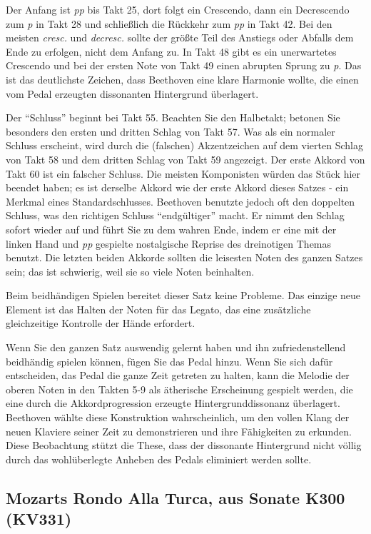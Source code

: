 Der Anfang ist \textit{pp} bis Takt 25, dort folgt ein Crescendo, dann ein Decrescendo zum \textit{p} in Takt 28 und schließlich die Rückkehr zum \textit{pp} in Takt 42.
Bei den meisten \textit{cresc.} und \textit{decresc.} sollte der größte Teil des Anstiegs oder Abfalls dem Ende zu erfolgen, nicht dem Anfang zu.
In Takt 48 gibt es ein unerwartetes Crescendo und bei der ersten Note von Takt 49 einen abrupten Sprung zu \textit{p}.
Das ist das deutlichste Zeichen, dass Beethoven eine klare Harmonie wollte, die einen vom Pedal erzeugten dissonanten Hintergrund überlagert.

Der \enquote{Schluss} beginnt bei Takt 55.
Beachten Sie den Halbetakt; betonen Sie besonders den ersten und dritten Schlag von Takt 57.
Was als ein normaler Schluss erscheint, wird durch die (falschen) Akzentzeichen auf dem vierten Schlag von Takt 58 und dem dritten Schlag von Takt 59 angezeigt.
Der erste Akkord von Takt 60 ist ein falscher Schluss.
Die meisten Komponisten würden das Stück hier beendet haben; es ist derselbe Akkord wie der erste Akkord dieses Satzes - ein Merkmal eines Standardschlusses.
Beethoven benutzte jedoch oft den doppelten Schluss, was den richtigen Schluss \enquote{endgültiger} macht.
Er nimmt den Schlag sofort wieder auf und führt Sie zu dem wahren Ende, indem er eine mit der linken Hand und \textit{pp} gespielte nostalgische Reprise des dreinotigen Themas benutzt.
Die letzten beiden Akkorde sollten die leisesten Noten des ganzen Satzes sein; das ist schwierig, weil sie so viele Noten beinhalten.

Beim beidhändigen Spielen bereitet dieser Satz keine Probleme.
Das einzige neue Element ist das Halten der Noten für das Legato, das eine zusätzliche gleichzeitige Kontrolle der Hände erfordert.

Wenn Sie den ganzen Satz auswendig gelernt haben und ihn zufriedenstellend beidhändig spielen können, fügen Sie das Pedal hinzu.
Wenn Sie sich dafür entscheiden, das Pedal die ganze Zeit getreten zu halten, kann die Melodie der oberen Noten in den Takten 5-9 als ätherische Erscheinung gespielt werden, die eine durch die Akkordprogression erzeugte Hintergrunddissonanz überlagert.
Beethoven wählte diese Konstruktion wahrscheinlich, um den vollen Klang der neuen Klaviere seiner Zeit zu demonstrieren und ihre Fähigkeiten zu erkunden.
Diese Beobachtung stützt die These, dass der dissonante Hintergrund nicht völlig durch das wohlüberlegte Anheben des Pedals eliminiert werden sollte.


\subsection{Mozarts Rondo Alla Turca, aus Sonate K300 (KV331)}\hypertarget{c1ii25c}{}

